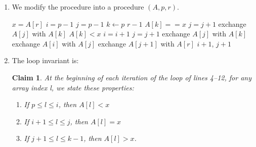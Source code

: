 \documentclass[11pt]{article}
\newtheorem{claim}[theorem]{Claim}
\theoremstyle{nonumberplain}
\begin{document}
\begin{enumerate}
\item We modify the  procedure into a procedure $(A,p,r)$.
\begin{codebox}
\li $x=A[r]$
\li $i=p-1$
\li $j=p-1$
\li \For $k \gets p$ \To $r-1$ \Do
\li     \If $A[k]==x$ \Do
\li         $j=j+1$
\li         exchange $A[j]$ with $A[k]$
\li     \Else \If $A[k]<x$
\li         $i=i+1$
\li         $j=j+1$
\li         exchange $A[j]$ with $A[k]$
\li         exchange $A[i]$ with $A[j]$
        \End
    \End
\li exchange $A[j+1]$ with $A[r]$
\li \Return $i+1$, $j+1$
\end{codebox}  
\item The loop invariant is:
\begin{claim}
 At the beginning of each iteration of the \For loop of lines 4--12, for any array index l, we state these properties:
 \begin{enumerate}
     \item[1.] If $p \le l \le i$, then $A[l]<x$
     \item[2.] If $i+1 \le l \le j$, then $A[l]=x$
     \item[3.] If $j+1 \le l \le k-1$, then $A[l]>x$.

\end{enumerate}
\end{claim}
\end{enumerate}
\end{document}
